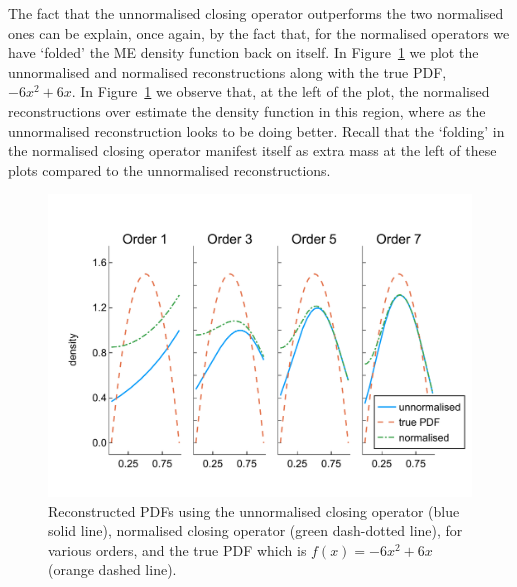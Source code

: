 The fact that the unnormalised closing operator outperforms the two normalised ones can be explain, once again, by the fact that, for the normalised operators we have `folded' the ME density function back on itself. In Figure~\ref{fig: pdf reconstructed quadratic} we plot the unnormalised and normalised reconstructions along with the true PDF, \(-6x^2+6x\). In Figure~\ref{fig: pdf reconstructed quadratic} we observe that, at the left of the plot, the normalised reconstructions over estimate the density function in this region, where as the unnormalised reconstruction looks to be doing better. Recall that the `folding' in the normalised closing operator manifest itself as extra mass at the left of these plots compared to the unnormalised reconstructions. 
\begin{figure}
	\centering
	\includegraphics[width=\textwidth]{chapter5/figs/qbdrap_closing_vec/fun6/pdfs_formatted.pdf}
	\caption{Reconstructed PDFs using the unnormalised closing operator (blue solid line), normalised closing operator (green dash-dotted line), for various orders, and the true PDF which is \(f(x)=-6x^2+6x\) (orange dashed line).}
	\label{fig: pdf reconstructed quadratic}
\end{figure} 

